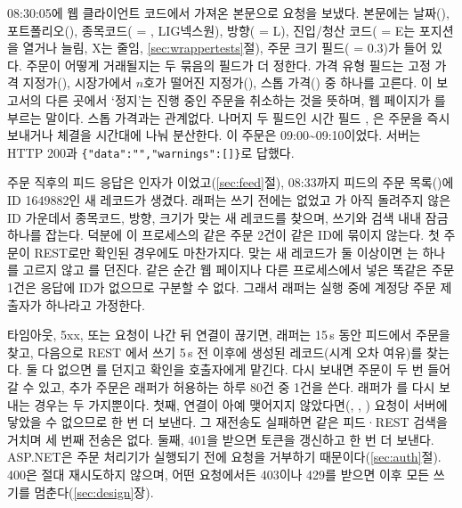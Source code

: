 \seclabel
{}

 08:30:05에 웹 클라이언트 코드에서 가져온 본문으로  요청을 보냈다. 본문에는 날짜(), 포트폴리오(), 종목코드( = , LIG넥스원), 방향( = L), 진입/청산 코드( = E는 포지션을 열거나 늘림, X는 줄임, \ref{sec:wrappertests}절), 주문 크기 필드( = 0.3)가 들어 있다. 주문이 어떻게 거래될지는 두 묶음의 필드가 더 정한다. 가격 유형 필드는 고정 가격 지정가(), 시장가에서 $n$호가 떨어진 지정가(), 스톱 가격() 중 하나를 고른다. 이 보고서의 다른 곳에서 ‘정지’는 진행 중인 주문을 취소하는 것을 뜻하며, 웹 페이지가 를 부르는 말이다. 스톱 가격과는 관계없다. 나머지 두 필드인 시간 필드 , 은 주문을 즉시 보내거나 체결을 시간대에 나눠 분산한다. 이 주문은 09:00\textasciitilde 09:10이었다. 서버는 HTTP 200과 \texttt{\{"data":"","warnings":[]\}}로 답했다.

 주문 직후의 피드 응답은 인자가 이었고(\ref{sec:feed}절), 08:33까지 피드의 주문 목록()에 ID 1649882인 새 레코드가 생겼다. 래퍼는 쓰기 전에는 없었고 가 아직 돌려주지 않은 ID 가운데서 종목코드, 방향, 크기가 맞는 새 레코드를 찾으며, 쓰기와 검색 내내 잠금 하나를 잡는다. 덕분에 이 프로세스의 같은 주문 2건이 같은 ID에 묶이지 않는다. 첫 주문이 REST로만 확인된 경우에도 마찬가지다. 맞는 새 레코드가 둘 이상이면 는 하나를 고르지 않고 를 던진다. 같은 순간 웹 페이지나 다른 프로세스에서 넣은 똑같은 주문 1건은 응답에 ID가 없으므로 구분할 수 없다. 그래서 래퍼는 실행 중에 계정당 주문 제출자가 하나라고 가정한다.

 타임아웃, 5xx, 또는 요청이 나간 뒤 연결이 끊기면, 래퍼는 15\,s 동안 피드에서 주문을 찾고, 다음으로 REST 에서 쓰기 5\,s 전 이후에 생성된 레코드(시계 오차 여유)를 찾는다. 둘 다 없으면 를 던지고 확인을 호출자에게 맡긴다. 다시 보내면 주문이 두 번 들어갈 수 있고, 추가 주문은 래퍼가 허용하는 하루 80건 중 1건을 쓴다. 래퍼가 를 다시 보내는 경우는 두 가지뿐이다. 첫째, 연결이 아예 맺어지지 않았다면(, , ) 요청이 서버에 닿았을 수 없으므로 한 번 더 보낸다. 그 재전송도 실패하면 같은 피드·REST 검색을 거치며 세 번째 전송은 없다. 둘째, 401을 받으면 토큰을 갱신하고 한 번 더 보낸다. ASP.NET은 주문 처리기가 실행되기 전에 요청을 거부하기 때문이다(\ref{sec:auth}절). 400은 절대 재시도하지 않으며, 어떤 요청에서든 403이나 429를 받으면 이후 모든 쓰기를 멈춘다(\ref{sec:design}장).

